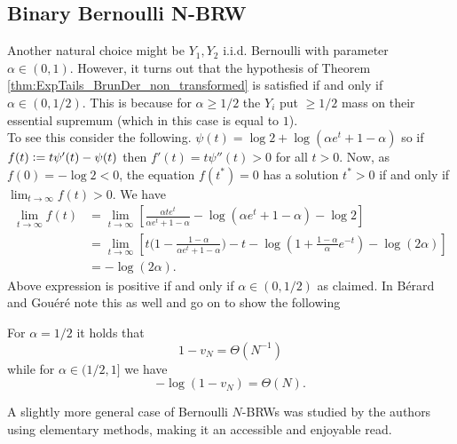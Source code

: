 \subsection{Binary Bernoulli N-BRW}\label{subsec:binary_bernoulli_BRW}
Another natural choice might be $Y_1, Y_2$ i.i.d. Bernoulli with parameter $\alpha \in (0, 1)$. However, it turns out that the hypothesis of Theorem \ref{thm:ExpTails_BrunDer_non_transformed} is satisfied if and only if $\alpha \in (0, 1/2)$. This is because for $\alpha \geq 1/2$ the $Y_i$ put $\geq 1/2$ mass on their essential supremum (which in this case is equal to $1$). \\

To see this consider the following. $\psi(t) = \log 2 + \log (\alpha e^t + 1 - \alpha)$ so if $f(t) \vcentcolon= t \psi'(t) - \psi(t)$ then $f'(t) = t \psi''(t) > 0$ for all $t > 0$. Now, as $f(0) = -\log 2 < 0$, the equation $f(t^*) = 0$ has a solution $t^* > 0$ if and only if $\lim_{t \to \infty} f(t) > 0$. We have
\begin{align*}
\lim\limits_{t \to \infty} f(t) &= \lim\limits_{t \to \infty} \left[\frac{\alpha t e^t}{\alpha e^t + 1 - \alpha} - \log(\alpha e^t + 1 - \alpha) - \log 2 \right] \\
								&= \lim\limits_{t \to \infty} \left[ t \big( 1 - \frac{1 - \alpha}{\alpha e^t + 1 - \alpha}\big) - t - \log (1 + \frac{1-\alpha}{\alpha} e^{-t}) - \log(2 \alpha) \right] \\
								&= - \log(2\alpha). 
\end{align*} 
Above expression is positive if and only if $\alpha \in (0, 1/2)$ as claimed. In \cite{exp_tails} Bérard and Gouéré note this as well and go on to show the following
\begin{theorem}
For $\alpha = 1/2$ it holds that
\begin{equation}\nonumber
1 - v_N = \Theta(N^{-1})
\end{equation}
while for $\alpha \in (1/2, 1]$ we have
\begin{equation}\nonumber
- \log (1 - v_N) = \Theta(N). 
\end{equation}
\end{theorem}
\begin{remark}A slightly more general case of Bernoulli $N$-BRWs was studied by the authors \cite{couronne2014branching} using elementary methods, making it an accessible and enjoyable read. 
\end{remark}


